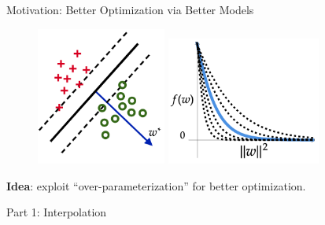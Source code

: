 \documentclass[mathserif,notheorems, hyperref={colorlinks, urlcolor=blue, linkcolor=blue}]{beamer}
\begin{document}
    \begin{frame}{Motivation: Better Optimization via Better Models}

        \begin{figure}
            \centering
            \includegraphics[width=0.38\textwidth]{figures/separable}
            \hspace{0.2em}
            \includegraphics[width=0.45\textwidth]{figures/loss_fn}
        \end{figure}
        \vspace{0.2em}

        \begin{center}
            \large \textbf{Idea}: exploit ``over-parameterization'' for better optimization.\vspace{0.25em}
        \end{center}

    \end{frame}



    \begin{frame}
       \begin{center}
          \huge Part 1: Interpolation 
       \end{center} 
    \end{frame}

\end{document}
